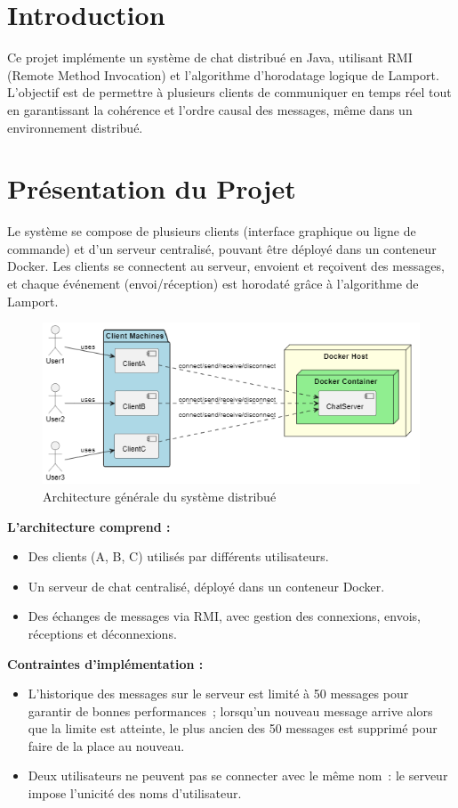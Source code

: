 \documentclass[a4paper,12pt]{article}
\begin{document}
\section{Introduction}
Ce projet implémente un système de chat distribué en Java, utilisant RMI (Remote Method Invocation) et l'algorithme d'horodatage logique de Lamport. L'objectif est de permettre à plusieurs clients de communiquer en temps réel tout en garantissant la cohérence et l'ordre causal des messages, même dans un environnement distribué.

\section{Présentation du Projet}
Le système se compose de plusieurs clients (interface graphique ou ligne de commande) et d'un serveur centralisé, pouvant être déployé dans un conteneur Docker. Les clients se connectent au serveur, envoient et reçoivent des messages, et chaque événement (envoi/réception) est horodaté grâce à l'algorithme de Lamport.

\begin{figure}[ht!]
    \centering
    \includegraphics[width=1\textwidth]{architecture.png}
    \caption{Architecture générale du système distribué}
\end{figure}

\textbf{L'architecture comprend :}
\begin{itemize}
    \item Des clients (A, B, C) utilisés par différents utilisateurs.
    \item Un serveur de chat centralisé, déployé dans un conteneur Docker.
    \item Des échanges de messages via RMI, avec gestion des connexions, envois, réceptions et déconnexions.
\end{itemize}

\textbf{Contraintes d'implémentation :}
\begin{itemize}
    \item L’historique des messages sur le serveur est limité à 50 messages pour garantir de bonnes performances~; lorsqu’un nouveau message arrive alors que la limite est atteinte, le plus ancien des 50 messages est supprimé pour faire de la place au nouveau.
    \item Deux utilisateurs ne peuvent pas se connecter avec le même nom~: le serveur impose l’unicité des noms d’utilisateur.
\end{itemize}
\end{document}
